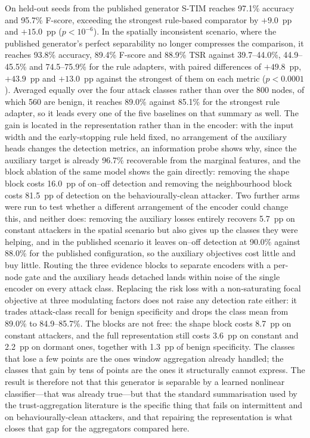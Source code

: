 \documentclass[notspecified,article,submit,moreauthors]{Definitions/mdpi}
\begin{document}
On held-out seeds from the published generator S-TIM reaches 97.1\% accuracy and 95.7\% F-score, exceeding the strongest rule-based comparator by $+9.0$~pp and $+15.0$~pp ($p<10^{-6}$). In the spatially inconsistent scenario, where the published generator's perfect separability no longer compresses the comparison, it reaches 93.8\% accuracy, 89.4\% F-score and 88.9\% TSR against 39.7--44.0\%, 44.9--45.5\% and 74.5--75.9\% for the rule adapters, with paired differences of $+49.8$~pp, $+43.9$~pp and $+13.0$~pp against the strongest of them on each metric ($p<0.0001$). Averaged equally over the four attack classes rather than over the 800 nodes, of which 560 are benign, it reaches 89.0\% against 85.1\% for the strongest rule adapter, so it leads every one of the five baselines on that summary as well. The gain is located in the representation rather than in the encoder: with the input width and the early-stopping rule held fixed, no arrangement of the auxiliary heads changes the detection metrics, an information probe shows why, since the auxiliary target is already 96.7\% recoverable from the marginal features, and the block ablation of the same model shows the gain directly: removing the shape block costs 16.0~pp of on--off detection and removing the neighbourhood block costs 81.5~pp of detection on the behaviourally-clean attacker. Two further arms were run to test whether a different arrangement of the encoder could change this, and neither does: removing the auxiliary losses entirely recovers 5.7~pp on constant attackers in the spatial scenario but also gives up the classes they were helping, and in the published scenario it leaves on--off detection at 90.0\% against 88.0\% for the published configuration, so the auxiliary objectives cost little and buy little. Routing the three evidence blocks to separate encoders with a per-node gate and the auxiliary heads detached lands within noise of the single encoder on every attack class. Replacing the risk loss with a non-saturating focal objective at three modulating factors does not raise any detection rate either: it trades attack-class recall for benign specificity and drops the class mean from 89.0\% to 84.9--85.7\%. The blocks are not free: the shape block costs 8.7~pp on constant attackers, and the full representation still costs 3.6~pp on constant and 2.2~pp on dormant ones, together with 1.3~pp of benign specificity. The classes that lose a few points are the ones window aggregation already handled; the classes that gain by tens of points are the ones it structurally cannot express. The result is therefore not that this generator is separable by a learned nonlinear classifier---that was already true---but that the standard summarisation used by the trust-aggregation literature is the specific thing that fails on intermittent and on behaviourally-clean attackers, and that repairing the representation is what closes that gap for the aggregators compared here.
\end{document}
